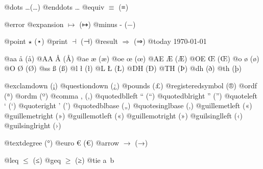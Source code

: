 \documentclass{book}
\renewcommand{\_}{\Texinfounderscore\discretionary{}{}{}}
\begin{document}
{@dots \dots{}\@ (…)
@enddots \dots{}
@equiv $\equiv{}$ (≡)

@error 
@expansion $\mapsto{}$ (↦)
@minus - (−)

@point $\star{}$ (⋆)
@print $\dashv{}$ (⊣)
@result $\Rightarrow{}$ (⇒)
@today \today{}

@aa \aa{} (å)
@AA \AA{} (Å)
@ae \ae{} (æ)
@oe \oe{} (œ)
@AE \AE{} (Æ)
@OE \OE{} (Œ)
@o \o{} (ø)
@O \O{} (Ø)
@ss \ss{} (ß)
@l \l{} (ł)
@L \L{} (Ł)
@DH \DH{} (Ð)
@TH \TH{} (Þ)
@dh \dh{} (ð)
@th \th{} (þ)

@exclamdown \textexclamdown{} (¡)
@questiondown \textquestiondown{} (¿)
@pounds \textsterling{} (£)
@registeredsymbol \circledR{} (®)
@ordf \textordfeminine{} (ª)
@ordm \textordmasculine{} (º)
@comma , (,)
@quotedblleft \textquotedblleft{} (“)
@quotedblright \textquotedblright{} (”)
@quoteleft \textquoteleft{} (‘)
@quoteright \textquoteright{} (’)
@quotedblbase \quotedblbase{} („)
@quotesinglbase \quotesinglbase{} (‚)
@guillemetleft \guillemotleft{} («)
@guillemetright \guillemotright{} (»)
@guillemotleft \guillemotleft{} («)
@guillemotright \guillemotright{} (»)
@guilsinglleft \guilsinglleft{} (‹)
@guilsinglright \guilsinglright{} (›)

@textdegree \textdegree{} (°)
@euro \euro{} (€)
@arrow $\rightarrow{}$ (→)

@leq $\leq{}$ (≤)
@geq $\geq{}$ (≥)
@tie a~b

}
\end{document}
